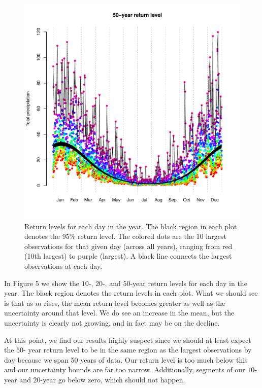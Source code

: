 \documentclass[12pt]{article}
\begin{document}
\begin{figure}[H]
\begin{center}
\includegraphics[scale=0.30]{../figs/return50.pdf}
\end{center}
\caption{Return levels for each day in the year. The black region in each plot denotes the 95\% return level. The colored dots are the 10 largest observations for that given day (across all years), ranging from red (10th largest) to purple (largest). A black line connects the largest observations at each day.}
\end{figure}

\noindent In Figure 5 we show the $10$-, $20$-, and $50$-year return levels for each day in the year. The black region denotes the return levels in each plot. What we should see is that as $m$ rises, the mean return level becomes greater as well as the uncertainty around that level. We do see an increase in the mean, but the uncertainty is clearly not growing, and in fact may be on the decline.
\bigskip

\noindent At this point, we find our results highly suspect since we should at least expect the $50$- year return level to be in the same region as the largest observations by day because we span 50 years of data. Our return level is too much below this and our uncertainty bounds are far too narrow. Additionally, segments of our $10$-year and $20$-year go below zero, which should not happen.
\end{document}
